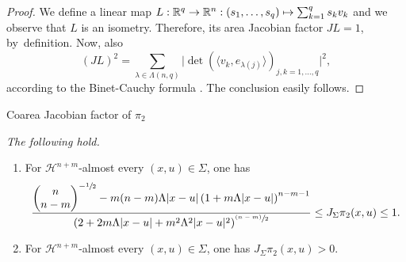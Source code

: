\documentclass[JEP,XML,SOM,Unicode,ThmDefs,NoEqCountersInSection]{cedram}
\newcommand\mto{\mathchoice{\longmapsto}{\mapsto}{\mapsto}{\mapsto}}
\newcommand{\psfrac}[2]{\sfrac{(#1)}{#2}}
\newenvironment{Empty}[2][\null]{%
\begin{enonce}[remark]{#1}#2}
{\end{enonce}}
\newcommand{\R}{\mathbb{R}}
\newcommand{\Rn}{\R^n}
\newcommand{\calH}{\mathscr{H}}
\newcommand{\bin}[2]{
\begin{pmatrix} #1 \\
#2
\end{pmatrix}}
\let\la\langle
\let\ra\rangle
\begin{document}
\begin{proof}
We define a linear map $L: \R^q \to \Rn: (s_1,\ldots,s_q) \mto \sum_{k=1}^q s_k v_k$ and we observe that $L$ is an isometry.
Therefore, its area Jacobian factor $JL=1$, by~definition.
Now, also
\begin{equation*}
(JL)^2 = \sum_{\lambda \in \Lambda(n,q)}\bigl| \det \left(\la v_k, e_{\lambda(j)} \ra \right)_{j,k=1,\ldots,q}\bigr|^2,
\end{equation*}
according to the Binet-Cauchy formula \cite[Chap.\,3, \S 2, Th.\,4]{EVANS.GARIEPY}.
The conclusion easily follows.
\end{proof}

\pagebreak[2]
\begin{Empty}[Coarea Jacobian factor of $\pi_2$]
\label{factor.pi.2}
{\it
The following hold.
\begin{enumerate}
\item\label{enum:24.1}
For $\calH^{n+m}$-almost every $(x,u) \in \Sigma$, one has
\begin{equation*}
\frac{\bin{n}{n-m}^{-\sfrac{1}{2}} - m(n-m) \Lambda |x-u| \left(1 + m \Lambda |x-u|\right)^{n-m-1}}{\left(2 + 2 m \Lambda |x-u| + m^2\Lambda^2|x-u|^2 \right)^{\psfrac{n-m}{2}}} \leq J_\Sigma \pi_2(x,u) \leq 1.
\end{equation*}
\item\label{enum:24.2}
For $\calH^{n+m}$-almost every $(x,u) \in \Sigma$, one has $J_\Sigma \pi_2(x,u) > 0$.
\end{enumerate}
}
\end{Empty}
\end{document}
